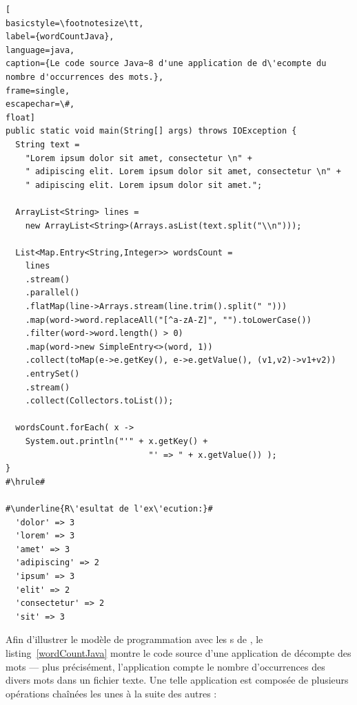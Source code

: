 \begin{lstlisting}[
basicstyle=\footnotesize\tt,
label={wordCountJava},
language=java,
caption={Le code source Java~8 d'une application de d\'ecompte du nombre d'occurrences des mots.},
frame=single,
escapechar=\#,
float]
public static void main(String[] args) throws IOException {
  String text = 
    "Lorem ipsum dolor sit amet, consectetur \n" +
    " adipiscing elit. Lorem ipsum dolor sit amet, consectetur \n" +
    " adipiscing elit. Lorem ipsum dolor sit amet.";
  
  ArrayList<String> lines = 
	new ArrayList<String>(Arrays.asList(text.split("\\n")));
	
  List<Map.Entry<String,Integer>> wordsCount = 
    lines
    .stream()
    .parallel()
    .flatMap(line->Arrays.stream(line.trim().split(" ")))
    .map(word->word.replaceAll("[^a-zA-Z]", "").toLowerCase())
    .filter(word->word.length() > 0)
    .map(word->new SimpleEntry<>(word, 1))
    .collect(toMap(e->e.getKey(), e->e.getValue(), (v1,v2)->v1+v2))
    .entrySet()
    .stream()
    .collect(Collectors.toList());   	
  
  wordsCount.forEach( x -> 
    System.out.println("'" + x.getKey() + 
                             "' => " + x.getValue()) );
}
#\hrule#

#\underline{R\'esultat de l'ex\'ecution:}#
  'dolor' => 3
  'lorem' => 3
  'amet' => 3
  'adipiscing' => 2
  'ipsum' => 3
  'elit' => 2
  'consectetur' => 2
  'sit' => 3
\end{lstlisting}


Afin d'illustrer le mod\`ele de programmation avec les s de , le listing~\ref{wordCountJava} montre le code source d'une application de d\'ecompte des mots --- plus pr\'ecis\'ement, l'application compte le nombre d'occurrences des divers mots dans un fichier texte. Une telle application est compos\'ee de plusieurs op\'erations cha\^in\'ees les unes \`a la suite des autres :


